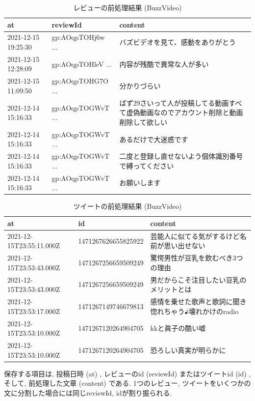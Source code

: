 \begin{table}[H]
  \caption{レビューの前処理結果 (BuzzVideo) }
  \label{tb:googlecsv}
  \begin{center}
  \begin{tabularx}{\linewidth}{|l|l|X|}
    \hline
    at&reviewId&content\\\hline\hline
    2021-12-15 19:25:30&gp:AOqpTOHj6w ...&バズビデオを見て、感動をありがとう\\\hline
    2021-12-15 12:28:09&gp:AOqpTOHleV ...&内容が残酷で異常な人が多い\\\hline
    2021-12-15 11:09:50&gp:AOqpTOHG7O ...&分かりづらい\\\hline
    2021-12-14 15:16:33&gp:AOqpTOGWvT ...&ばず29さいって人が投稿してる動画すべて虚偽動画なのでアカウント削除と動画削除して欲しい\\\hline
    2021-12-14 15:16:33&gp:AOqpTOGWvT ...&あるだけで大迷惑です\\\hline
    2021-12-14 15:16:33&gp:AOqpTOGWvT ...&二度と登録し直せないよう個体識別番号で縛ってください\\\hline
    2021-12-14 15:16:33&gp:AOqpTOGWvT ...&お願いします\\\hline
  \end{tabularx}\end{center}
\end{table}

\begin{table}[H]
  \caption{ツイートの前処理結果 (BuzzVideo) }
  \label{tb:twittercsv}
  \begin{center}
  \begin{tabularx}{\linewidth}{|l|l|X|}
    \hline
    at&id&content\\\hline\hline
    2021-12-15T23:55:11.000Z&1471267626655825922&芸能人に似てる気がするけど名前が思い出せない\\\hline
    2021-12-15T23:53:43.000Z&1471267256659509249&驚愕男性が豆乳を飲むべき3つの理由\\\hline
    2021-12-15T23:53:43.000Z&1471267256659509249&男だからこそ注目したい豆乳のメリットとは\\\hline
    2021-12-15T23:53:17.000Z&1471267149746679813&感情を乗せた歌声と歌詞に聞き惚れちゃう♪壊れかけのradio\\\hline
    2021-12-15T23:53:10.000Z&1471267120264904705&kkと眞子の酷い嘘\\\hline
    2021-12-15T23:53:10.000Z&1471267120264904705&恐ろしい真実が明らかに\\\hline
  \end{tabularx}\end{center}
\end{table}
保存する項目は, 投稿日時 (at) , レビューのid (reviewId) またはツイートid (id) , そして, 前処理した文章 (content) である. 
1つのレビュー, ツイートをいくつかの文に分割した場合には同じreviewId, idが割り振られる. 

